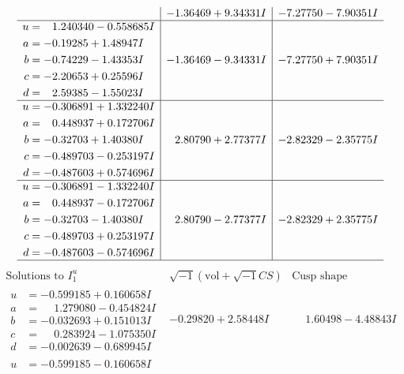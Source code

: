 \documentclass[1p]{elsarticle_modified}
\theoremstyle{definition}
\newcommand{\I}{\sqrt{-1}}
\begin{document}
$$\begin{array}{c|c|c}
 & -1.36469 + 9.34331 I & -7.27750 - 7.90351 I \\ \hline\begin{aligned}
u &= \phantom{-}1.240340 - 0.558685 I \\
a &= -0.19285 + 1.48947 I \\
b &= -0.74229 - 1.43353 I \\
c &= -2.20653 + 0.25596 I \\
d &= \phantom{-}2.59385 - 1.55023 I\end{aligned}
 & -1.36469 - 9.34331 I & -7.27750 + 7.90351 I \\ \hline\begin{aligned}
u &= -0.306891 + 1.332240 I \\
a &= \phantom{-}0.448937 + 0.172706 I \\
b &= -0.32703 + 1.40380 I \\
c &= -0.489703 - 0.253197 I \\
d &= -0.487603 + 0.574696 I\end{aligned}
 & \phantom{-}2.80790 + 2.77377 I & -2.82329 - 2.35775 I \\ \hline\begin{aligned}
u &= -0.306891 - 1.332240 I \\
a &= \phantom{-}0.448937 - 0.172706 I \\
b &= -0.32703 - 1.40380 I \\
c &= -0.489703 + 0.253197 I \\
d &= -0.487603 - 0.574696 I\end{aligned}
 & \phantom{-}2.80790 - 2.77377 I & -2.82329 + 2.35775 I\\
 \hline 
 \end{array}$$\newpage$$\begin{array}{c|c|c}  
\text{Solutions to }I^u_{1}& \I (\text{vol} + \sqrt{-1}CS) & \text{Cusp shape}\\
 \hline 
\begin{aligned}
u &= -0.599185 + 0.160658 I \\
a &= \phantom{-}1.279080 - 0.454824 I \\
b &= -0.032693 + 0.151013 I \\
c &= \phantom{-}0.283924 - 1.075350 I \\
d &= -0.002639 - 0.689945 I\end{aligned}
 & -0.29820 + 2.58448 I & \phantom{-}1.60498 - 4.48843 I \\ \hline\begin{aligned}
u &= -0.599185 - 0.160658 I \\

\end{aligned}
\end{array}$$
\end{document}
